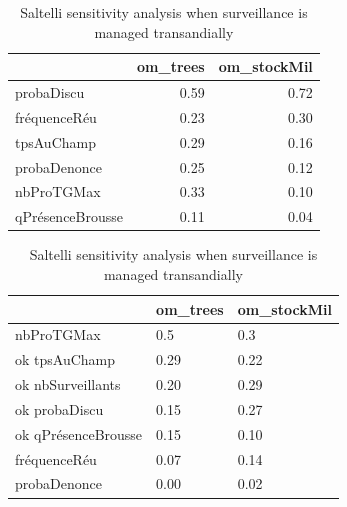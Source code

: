 \documentclass{article}
\begin{document}
        
        \begin{table}[ht]
            \centering
            \begin{minipage}{.45\linewidth}
                \centering
                \begingroup\fontsize{10}{12}\selectfont
                \begin{tabular}[]{lrr}
                    \toprule
                    ~ & om\_trees & om\_stockMil\\
                    \hline
                    \addlinespace
                    probaDiscu & 0.59 & 0.72\\
                    fréquenceRéu & 0.23 & 0.30\\
                    tpsAuChamp & 0.29 & 0.16\\
                    probaDenonce & 0.25 & 0.12\\
                    nbProTGMax & 0.33 & 0.10\\
                    qPrésenceBrousse & 0.11 & 0.04\\
                    \bottomrule
                \end{tabular}
                \caption{Saltelli sensitivity analysis when surveillance is delegated to the community}
                \label{tab:saltelliCom}
                \endgroup{}
            \end{minipage}\hfill
            \begin{minipage}{.45\linewidth}
                \centering
                \begingroup\fontsize{10}{12}\selectfont
                \begin{tabular}[]{lll}
                    \toprule
                    ~ & om\_trees & om\_stockMil\\
                    \hline
                    \addlinespace
                    nbProTGMax & 0.5 & 0.3\\ ok
                    tpsAuChamp & 0.29 & 0.22\\ ok
                    nbSurveillants & 0.20 & 0.29\\ ok
                    probaDiscu & 0.15 & 0.27\\ ok
                    qPrésenceBrousse & 0.15 & 0.10\\
                    fréquenceRéu & 0.07 & 0.14\\
                    probaDenonce & 0.00 & 0.02\\
                    \bottomrule
                \end{tabular}
                \caption{Saltelli sensitivity analysis when surveillance is managed transandially}
                \label{tab:saltelliReprz}
                \endgroup{}
            \end{minipage}
        \end{table}
        
\end{document}
